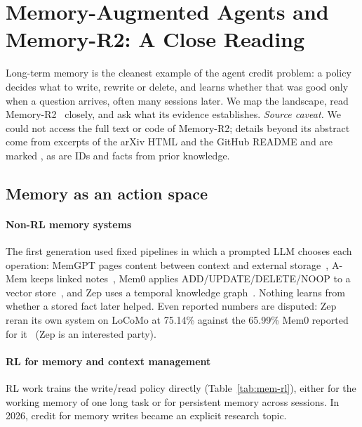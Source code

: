 \section{Memory-Augmented Agents and Memory-R2: A Close Reading}\label{sec:memory}

Long-term memory is the cleanest example of the agent credit problem: a policy decides what to write, rewrite or delete, and learns whether that was good only when a question arrives, often many sessions later. We map the landscape, read Memory-R2~\citep{yan2026memory} closely, and ask what its evidence establishes.
\emph{Source caveat.} We could not access the full text or code of Memory-R2; details beyond its abstract come from excerpts of the arXiv HTML and the GitHub README and are marked \unverified, as are IDs and facts from prior knowledge.

\subsection{Memory as an action space}

\paragraph{Non-RL memory systems}
The first generation used fixed pipelines in which a prompted LLM chooses each operation: MemGPT pages content between context and external storage~\citep{packer2023memgpt}, A-Mem keeps linked notes~\citep{xu2025amem}, Mem0 applies ADD\slash UPDATE\slash DELETE\slash NOOP to a vector store~\citep{chhikara2025mem0}, and Zep uses a temporal knowledge graph~\citep{rasmussen2025zep}\unverified. Nothing learns from whether a stored fact later helped. Even reported numbers are disputed: Zep reran its own system on LoCoMo at 75.14\% against the 65.99\% Mem0 reported for it~\citep{zepmem0} (Zep is an interested party).

\paragraph{RL for memory and context management}
RL work trains the write/read policy directly (Table~\ref{tab:mem-rl}), either for the working memory of one long task or for persistent memory across sessions. In 2026, credit for memory writes became an explicit research topic.


